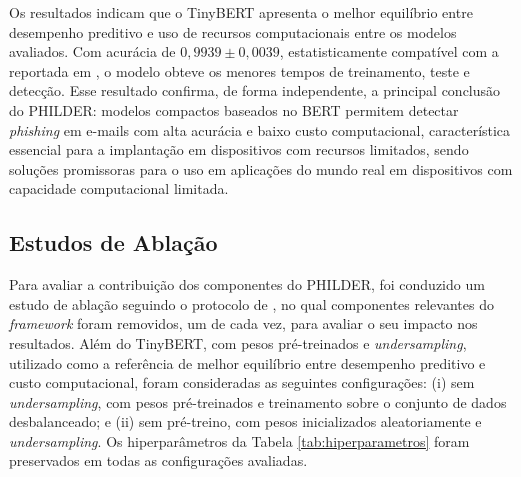 \documentclass[12pt]{article}
\begin{document}
        Os resultados indicam que o TinyBERT apresenta o melhor equilíbrio entre desempenho preditivo e uso de recursos computacionais entre os modelos avaliados. Com acurácia de $0{,}9939 \pm 0{,}0039$, estatisticamente compatível com a reportada em \cite{bispo2025philder}, o modelo obteve os menores tempos de treinamento, teste e detecção. Esse resultado confirma, de forma independente, a principal conclusão do PHILDER: modelos compactos baseados no BERT permitem detectar \textit{phishing} em e-mails com alta acurácia e baixo custo computacional, característica essencial para a implantação em dispositivos com recursos limitados, sendo soluções promissoras para o uso em aplicações do mundo real em dispositivos com capacidade computacional limitada.
    


 \subsection{Estudos de Ablação} \label{sub:est_ablacao}

       Para avaliar a contribuição dos componentes do PHILDER, foi conduzido um estudo de ablação seguindo o protocolo de \cite{bispo2025philder}, no qual componentes relevantes do \textit{framework} foram removidos, um de cada vez, para avaliar o seu impacto nos resultados. Além do TinyBERT, com pesos pré-treinados e \textit{undersampling}, utilizado como a referência de melhor equilíbrio entre desempenho preditivo e custo computacional, foram consideradas as seguintes configurações: (i) sem \textit{undersampling}, com pesos pré-treinados e treinamento sobre o conjunto de dados desbalanceado; e (ii) sem pré-treino, com pesos inicializados aleatoriamente e \textit{undersampling}.  Os hiperparâmetros da Tabela \ref{tab:hiperparametros} foram preservados em todas as configurações avaliadas.


       
\end{document}
